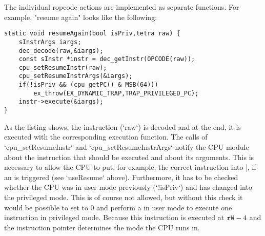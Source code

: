 The individual ropcode actions are implemented as separate functions. For example, "resume again" looks like the following:
\begin{lstlisting}[language=GIMMIXC,caption={Implementation of the "resume again" action}]
static void resumeAgain(bool isPriv,tetra raw) {
	sInstrArgs iargs;
	dec_decode(raw,&iargs);
	const sInstr *instr = dec_getInstr(OPCODE(raw));
	cpu_setResumeInstr(raw);
	cpu_setResumeInstrArgs(&iargs);
	if(!isPriv && (cpu_getPC() & MSB(64)))
		ex_throw(EX_DYNAMIC_TRAP,TRAP_PRIVILEGED_PC);
	instr->execute(&iargs);
}
\end{lstlisting}
As the listing shows, the instruction (`raw`) is decoded and at the end, it is executed with the corresponding execution function. The calls of `cpu_setResumeInstr` and `cpu_setResumeInstrArgs` notify the CPU module about the instruction that should be executed and about its arguments. This is necessary to allow the CPU to put, for example, the correct instruction into |, if an  is triggered (see `useResume` above). Furthermore, it has to be checked whether the CPU was in user mode previously (`!isPriv`) and has changed into the privileged mode. This is of course not allowed, but without this check it would be possible to set  to 0 and perform a  in user mode to execute one instruction in privileged mode. Because this instruction is executed at ${\tt rW}-4$ and the instruction pointer determines the mode the CPU runs in.

